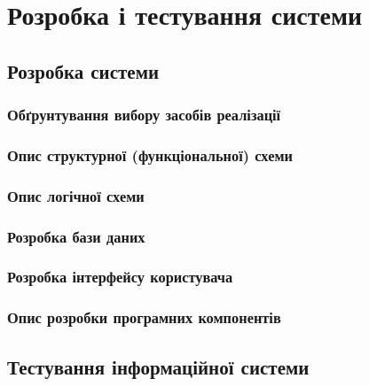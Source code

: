 \documentclass[../main.tex]{subfiles}
\begin{document}
	
\chapter{Розробка і тестування системи}
	
\section{Розробка  системи}
	
\subsection{Обґрунтування вибору засобів реалізації}

\subsection{Опис структурної (функціональної) схеми}

\subsection{Опис логічної схеми}

\subsection{Розробка бази даних}

\subsection{Розробка інтерфейсу користувача}

\subsection{Опис розробки програмних компонентів}

\section{Тестування інформаційної системи}
	
\end{document}

